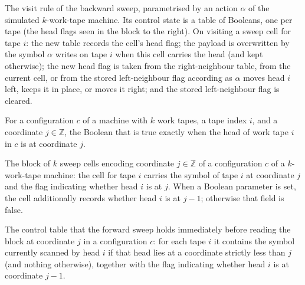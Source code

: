 \begin{definition}
\label{Turing.FinTM.writeVisit}
\leanok
{}
The visit rule of the backward sweep, parametrised by an action $\alpha$ of the
simulated $k$-work-tape machine. Its control state is a table of Booleans, one per tape
(the head flags seen in the block to the right). On visiting a sweep cell for tape $i$:
the new table records the cell's head flag; the payload is overwritten by the symbol
$\alpha$ writes on tape $i$ when this cell carries the head (and kept otherwise); the
new head flag is taken from the right-neighbour table, from the current cell, or from
the stored left-neighbour flag according as $\alpha$ moves head $i$ left, keeps it in
place, or moves it right; and the stored left-neighbour flag is cleared.
\end{definition}

\begin{definition}
\label{Turing.FinTM.headAt}
\leanok
{}
For a configuration $c$ of a machine with $k$ work tapes, a tape index $i$, and a
coordinate $j \in \mathbb{Z}$, the Boolean that is true exactly when the head of work
tape $i$ in $c$ is at coordinate $j$.
\end{definition}

\begin{definition}
\label{Turing.FinTM.tapeRow}
\leanok
{}
The block of $k$ sweep cells encoding coordinate $j \in \mathbb{Z}$ of a configuration
$c$ of a $k$-work-tape machine: the cell for tape $i$ carries the symbol of tape $i$ at
coordinate $j$ and the flag indicating whether head $i$ is at $j$. When a Boolean
parameter is set, the cell additionally records whether head $i$ is at $j-1$; otherwise
that field is false.
\end{definition}

\begin{definition}
\label{Turing.FinTM.readState}
\leanok
{}
The control table that the forward sweep holds immediately before reading the block at
coordinate $j$ in a configuration $c$: for each tape $i$ it contains the symbol
currently scanned by head $i$ if that head lies at a coordinate strictly less than $j$
(and nothing otherwise), together with the flag indicating whether head $i$ is at
coordinate $j-1$.
\end{definition}

